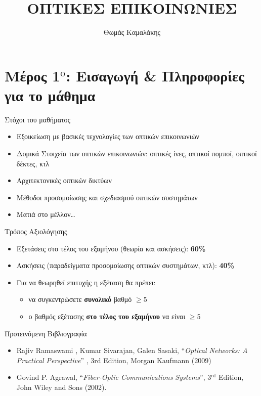 \documentclass[11pt,aspectratio=169]{beamer}
\title[Οπτικές Επικοινωνίες]{ΟΠΤΙΚΕΣ ΕΠΙΚΟΙΝΩΝΙΕΣ}
\author[Θ. Καμαλάκης]{Θωμάς Καμαλάκης}
\institute[ΧΠΑ]{Τμήμα Πληροφορικής και Τηλεματικής, Χαροκόπειο Πανεπιστήμιο}
\date{}
\begin{document}
\begin{frame}
\titlepage
\end{frame}


\section[Εισαγωγή]{Mέρος 1$^{\text{ο}}$: Εισαγωγή \& Πληροφορίες για το μάθημα}
\begin{frame}
\vfill
\begin{center}
{\Large{}}
\end{center}
\vfill
\end{frame}

\begin{frame}[t]{Στόχοι του μαθήματος}
\begin{itemize}
\item Εξοικείωση με βασικές τεχνολογίες των οπτικών επικοινωνιών
\item Δομικά Στοιχεία των οπτικών επικοινωνιών: οπτικές ίνες, οπτικοί πομποί, οπτικοί δέκτες, κτλ
\item Αρχιτεκτονικές οπτικών δικτύων
\item Μέθοδοι προσομοίωσης και σχεδιασμού οπτικών συστημάτων
\item Ματιά στο μέλλον…
\end{itemize}
\end{frame}

\begin{frame}[t]{Τρόπος Αξιολόγησης}
\begin{itemize}
\item Εξετάσεις στο τέλος του εξαμήνου (θεωρία και ασκήσεις): \textbf{6}\textbf{0\%}
\item Ασκήσεις (παραδείγματα προσομοίωσης οπτικών συστημάτων, κτλ): \textbf{40}\textbf{\%}
\item Για να θεωρηθεί επιτυχής η εξέταση θα πρέπει:
\begin{itemize}
\item να συγκεντρώσετε \textbf{συνολικό} βαθμό \ensuremath{\ge}5
\item ο βαθμός εξέτασης \textbf{στο τέλος του εξαμήνου} να είναι \ensuremath{\ge}5
\end{itemize}
\end{itemize}
\end{frame}

\begin{frame}[t]{Προτεινόμενη Βιβλιογραφία}
\begin{itemize}
\item Rajiv Ramaswami , Kumar Sivarajan, Galen Sasaki, “\textit{Optical Networks: A Practical Perspective}” , 3rd Edition, Morgan Kaufmann (2009)
\item Govind P. Agrawal, “\textit{Fiber-Optic Communications Systems}”, 3$^{\text{rd}}$ Edition, John Wiley and Sons (2002).
\end{itemize}
\end{frame}
\end{document}
